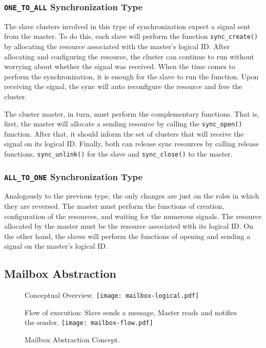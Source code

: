 				\subsubsection*{\texttt{ONE\_TO\_ALL} Synchronization Type}

					The slave clusters involved in this type of synchronization expect
					a signal sent from the master.
					To do this, each slave will perform the function \texttt{sync\_create()}
					by allocating the resource associated with the master's logical ID.
					After allocating and configuring the resource, the cluster can
					continue to run without worrying about whether the signal was received.
					When the time comes to perform the synchronization, it is enough for
					the slave to run the function.
					Upon receiving the signal, the sync will auto reconfigure the resource
					and free the cluster.

					The cluster master, in turn, must perform the complementary functions.
					That is, first, the master will allocate a sending resource by calling
					the \texttt{sync\_open()} function.
					After that, it should inform the set of clusters that will receive the
					signal on its logical ID.
					Finally, both can release sync resources by calling release functions,
					\texttt{sync\_unlink()} for the slave and \texttt{sync\_close()} to
					the master.

				\subsubsection*{\texttt{ALL\_TO\_ONE} Synchronization Type}

					Analogously to the previous type, the only changes are just on
					the roles in which they are reversed.
					The master must perform the functions of creation, configuration
					of the resources, and waiting for the numerous signals.
					The resource allocated by the master must be the resource
					associated with its logical ID.
					On the other hand, the slaves will perform the functions of
					opening and sending a signal on the master's logical ID.

		\subsection{Mailbox Abstraction}
		\label{sec.mailbox-abs}

			\begin{figure}[!tb]
				\centering%
				\caption{Mailbox Abstraction Concept.}%
				\label{fig:conpt_mailbox}%

					{Conceptual Overview.}%
					{\texttt{[image: mailbox-logical.pdf]}}%

				\hfill

					{Flow of execution: Slave sends a message, Master reads and notifies the sender.}%
					{\texttt{[image: mailbox-flow.pdf]}}%

			\end{figure}

